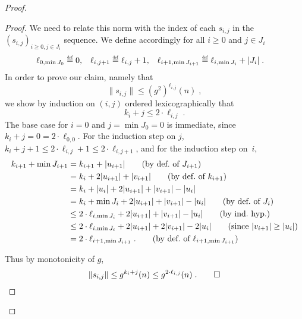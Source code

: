 \documentclass[11pt,reqno,a4paper]{amsart}
\newcommand{\eqdef}{\stackrel{\raisebox{-.15ex}{\scalebox{.5}{\upshape\textrm{def}}}}{=}}
\newcommand{\norm}[1]{\|#1\|}
\theoremstyle{plain}
\theoremstyle{definition}
\theoremstyle{remark}
\providecommand{\qedhere}{\qed}
\begin{document}
\begin{proof}
\begin{proof}
  We need to relate this norm with the index of each $s_{i,j}$ in
  the $(s_{i,j})_{i\geq 0,j\in J_i}$ sequence.  We define accordingly
  for all $i\geq 0$ and $j\in J_i$
  \begin{align*}
    \ell_{0,\min J_0}&\eqdef 0,&\ell_{i,j+1}&\eqdef \ell_{i,j}+1,&\ell_{i+1,\min
      J_{i+1}}&\eqdef\ell_{i,\min J_i}+|J_i|\;.
  \end{align*}
  In order to prove our claim, namely that
  \begin{equation*}
    \norm{s_{i,j}}\leq (g^2)^{\ell_{i,j}}(n)\;,
  \end{equation*}
  we show by induction on $(i,j)$ ordered lexicographically that 
  \begin{equation*}
    k_i+j \leq 2\cdot \ell_{i,j}\;.
  \end{equation*}
  The base case for $i=0$ and $j=\min J_0=0$ is immediate, since
  $k_i+j=0=2\cdot\ell_{0,0}$.  For the induction step on $j$,
  $k_i+j+1\leq 2\cdot\ell_{i,j}+1\leq 2\cdot\ell_{i,j+1}$, and for the
  induction step on~$i$,
  \begin{align*}
    k_{i+1}+\min J_{i+1}
    &=k_{i+1}+|u_{i+1}|\tag{by def.\ of $J_{i+1}$}\\
    &=k_i+2|u_{i+1}|+|v_{i+1}|\tag{by def.\ of $k_{i+1}$}\\
    &=k_i+|u_i|+2|u_{i+1}|+|v_{i+1}|-|u_i|\\
    &=k_i+\min J_i+2|u_{i+1}|+|v_{i+1}|-|u_i|\tag{by def.\ of $J_i$}\\
    &\leq 2\cdot\ell_{i,\min J_i}+2|u_{i+1}|+|v_{i+1}|-|u_i|\tag{by ind.\ hyp.}\\
    &\leq 2\cdot\ell_{i,\min
      J_i}+2|u_{i+1}|+2|v_{i+1}|-2|u_i|\tag{since $|v_{i+1}|\geq |u_i|$}\\
    &=2\cdot\ell_{i+1,\min J_{i+1}}\;.\tag{by def.\ of $\ell_{i+1,\min
        J_{i+1}}$}
  \end{align*}

  Thus by monotonicity of $g$,
  \begin{equation*}
    \norm{s_{i,j}}\leq g^{k_i+j}(n)\leq g^{2\cdot\ell_{i,j}}(n)\;.\qedhere
  \end{equation*}
\end{proof}


\end{proof}
\end{document}
